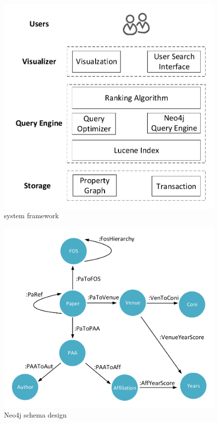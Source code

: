\begin{figure}
\centering
\includegraphics[width=\columnwidth]{systemFrame.pdf}
\caption{system framework}
\label{fig:frame}
\end{figure}


\begin{figure}
\centering
\includegraphics[width=\columnwidth]{neo4jSchema.pdf}
\caption{Neo4j schema design}
\label{fig:schema}
\end{figure}

